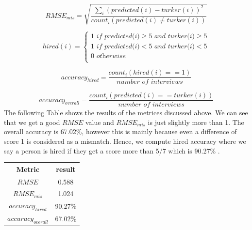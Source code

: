 \documentclass[11pt]{article}
\begin{document}
\begin{equation}
 RMSE_{mis} = \sqrt{\frac{\sum_{i}(predicted(i)-turker(i))^2}{count_{i}(predicted(i) \neq turker(i))}}
\end{equation}

\begin{equation}
     hired(i) = \left\{
                \begin{array}{ll}
                  1 \textit{ if predicted(i)} \geq 5 \textit{ and  turker(i)} \geq 5\\
                  1 \textit{ if predicted(i)} < 5 \textit{ and  turker(i)} < 5\\
                  0 \textit{ otherwise}\\
                \end{array}
              \right.
\end{equation}

\begin{equation}
 accuracy_{hired} = \frac{count_{i}(hired(i) == 1)}{\textit{number of interviews}}
\end{equation}

\begin{equation}
 accuracy_{overall} = \frac{count_{i}(predicted(i) == turker(i))}{\textit{number of interviews}}
\end{equation}
The following Table shows the results of the metrices discussed above. We can see that we get a good $RMSE$ value and $RMSE_{mis}$ is just slightly more than 1. The overall accuracy is 67.02\%, however this is mainly because even a difference of score 1 is considered as a mismatch. Hence, we compute hired accuracy where we say a person is hired if they get a score more than 5/7 which is 90.27\% .
\begin{center}
\begin{tabular}{ |c|c| } 
 \hline
 \textbf{Metric} & \textbf{result} \\
 \hline
 $RMSE$ &  0.588 \\ 
 \hline
 $RMSE_{mis}$ &  1.024 \\ 
 \hline
 $accuracy_{hired}$ &  90.27\% \\ 
 \hline
 $accuracy_{overall}$ &  67.02\% \\ 
 \hline
\end{tabular}
\end{center}
\end{document}
